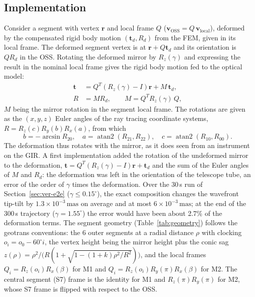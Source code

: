 \documentclass{gmto}
\numberwithin{table}{section}
\numberwithin{equation}{section}
\newcommand{\mas}{\,\mathrm{mas}}
\newcommand{\vect}[1]{\boldsymbol{#1}}
\begin{document}
\subsection{Implementation}
\label{sec:pupil-impl}

Consider a segment with vertex $\vect{r}$ and local frame $Q$ ($\vect{v}_{\mathrm{OSS}} = Q\,\vect{v}_{\mathrm{local}}$),
deformed by the compensated rigid body motion $(\vect{t}_d, R_d)$ from the FEM, given in its local frame.
The deformed segment vertex is at $\vect{r} + Q\vect{t}_d$ and its orientation is $QR_d$ in the OSS.
Rotating the deformed mirror by $R_z(\gamma)$ and expressing the result in the nominal local frame gives
the rigid body motion fed to the optical model:
\begin{align}
  \vect{t} &= Q^{T}\left(R_z(\gamma) - I\right)\vect{r} + M\,\vect{t}_d, \label{eq:gir-t}\\
  R &= M R_d, \qquad M = Q^{T} R_z(\gamma)\, Q, \label{eq:gir-r}
\end{align}
$M$ being the mirror rotation in the segment local frame. The rotations are given as the $(x,y,z)$ Euler
angles of the ray tracing coordinate systems, $R = R_z(c)R_y(b)R_x(a)$, from which
\begin{equation}
  b = -\arcsin R_{20},\quad a = \operatorname{atan2}(R_{21}, R_{22}),\quad
  c = \operatorname{atan2}(R_{10}, R_{00}).
\end{equation}
The deformation thus rotates with the mirror, as it does seen from an instrument on the GIR.
A first implementation added the rotation of the undeformed mirror to the deformation,
$\vect{t} = Q^{T}(R_z(\gamma) - I)\vect{r} + \vect{t}_d$ and the sum of the Euler angles of $M$ and $R_d$:
the deformation was left in the orientation of the telescope tube, an error of the order of
$\gamma$ times the deformation. Over the 30\,s run of Section~\ref{sec:ver-e2e} ($\gamma \le 0.15^\circ$),
the exact composition changes the wavefront tip-tilt by $1.3\times10^{-3}\mas$ on average and at most
$6\times10^{-3}\mas$; at the end of the 300\,s trajectory ($\gamma = 1.55^\circ$) the error would have
been about 2.7\% of the deformation terms.
The segment geometry (Table~\ref{tab:geometry}) follows the geotrans conventions: the 6 outer
segments at a radial distance $\rho$ with clocking $o_i = o_0 - 60^\circ i$, the vertex height being
the mirror height plus the conic sag $z(\rho) = \rho^2/\big(R(1+\sqrt{1-(1+k)\rho^2/R^2})\big)$, and
the local frames $Q_i = R_z(o_i)R_x(\beta)$ for M1 and $Q_i = R_z(o_i)R_y(\pi)R_x(\beta)$ for M2.
The central segment (S7) frame is the identity for M1 and $R_z(\pi)R_y(\pi)$ for M2,
whose S7 frame is flipped with respect to the OSS.
\end{document}
